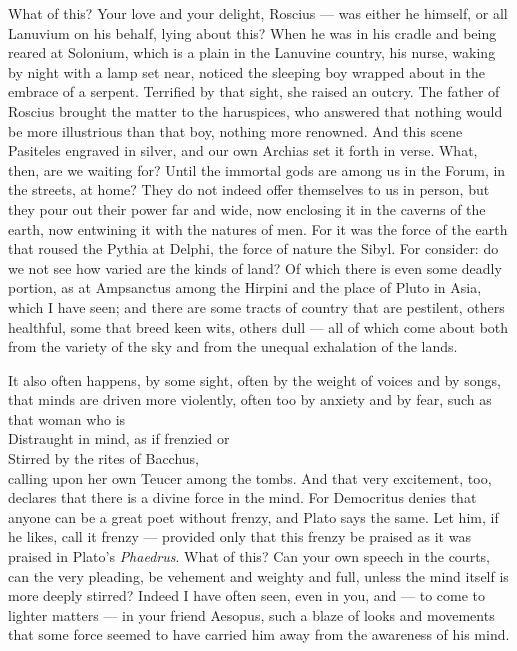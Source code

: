  What of this? Your love and your delight, Roscius — was either he himself, or all Lanuvium on his behalf, lying about this? When he was in his cradle and being reared at Solonium, which is a plain in the Lanuvine country, his nurse, waking by night with a lamp set near, noticed the sleeping boy wrapped about in the embrace of a serpent. Terrified by that sight, she raised an outcry. The father of Roscius brought the matter to the haruspices, who answered that nothing would be more illustrious than that boy, nothing more renowned. And this scene Pasiteles engraved in silver, and our own Archias set it forth in verse. What, then, are we waiting for? Until the immortal gods are among us in the Forum, in the streets, at home? They do not indeed offer themselves to us in person, but they pour out their power far and wide, now enclosing it in the caverns of the earth, now entwining it with the natures of men. For it was the force of the earth that roused the Pythia at Delphi, the force of nature the Sibyl. For consider: do we not see how varied are the kinds of land? Of which there is even some deadly portion, as at Ampsanctus among the Hirpini and the place of Pluto in Asia, which I have seen; and there are some tracts of country that are pestilent, others healthful, some that breed keen wits, others dull — all of which come about both from the variety of the sky and from the unequal exhalation of the lands.

 It also often happens, by some sight, often by the weight of voices and by songs, that minds are driven more violently, often too by anxiety and by fear, such as that woman who is \\ Distraught in mind, as if frenzied or \\ Stirred by the rites of Bacchus, \\ calling upon her own Teucer among the tombs. And that very excitement, too, declares that there is a divine force in the mind. For Democritus denies that anyone can be a great poet without frenzy, and Plato says the same. Let him, if he likes, call it frenzy — provided only that this frenzy be praised as it was praised in Plato's \textit{Phaedrus}. What of this? Can your own speech in the courts, can the very pleading, be vehement and weighty and full, unless the mind itself is more deeply stirred? Indeed I have often seen, even in you, and — to come to lighter matters — in your friend Aesopus, such a blaze of looks and movements that some force seemed to have carried him away from the awareness of his mind.


